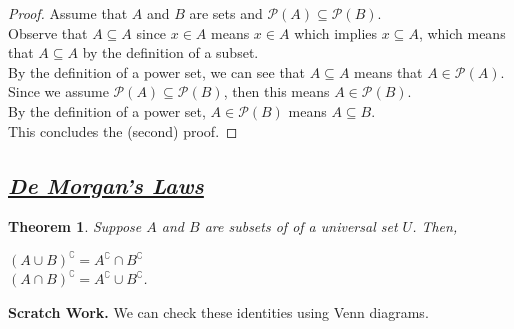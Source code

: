 \documentclass{amsart} %
\newtheorem{thm}{Theorem} %
\theoremstyle{definition} %
\theoremstyle{definition}
\theoremstyle{remark} %
\begin{document}
\begin{proof}
      Assume that $A$ and $B$ are sets and $\mathcal{P}(A) \subseteq \mathcal{P}(B)$. \\
      \indent Observe that $A \subseteq A$ since $x \in A$ means $x \in A$ which implies $x \subseteq A$, which means that $A \subseteq A$ by the definition of a subset. \\
      \indent By the definition of a power set, we can see that $A \subseteq A$ means that $A \in \mathcal{P}(A)$. Since we assume $\mathcal{P}(A) \subseteq \mathcal{P}(B)$, then this means $A \in \mathcal{P}(B)$. \\
      \indent By the definition of a power set, $A \in \mathcal{P}(B)$ means $A \subseteq B$. \\
      \indent This concludes the (second) proof.
\end{proof}













\bigskip \bigskip

\subsection{\underline{\emph{De Morgan's Laws}}}

\begin{thm}
      Suppose $A$ and $B$ are subsets of of a universal set $U$. Then,
      \begin{center}
            $(A \cup B)^\complement = A^\complement \cap B^\complement$ \\
            $(A \cap B)^\complement = A^\complement \cup B^\complement$.
      \end{center}
\end{thm}



\noindent \textbf{Scratch Work.} We can check these identities using Venn diagrams.
\end{document}
